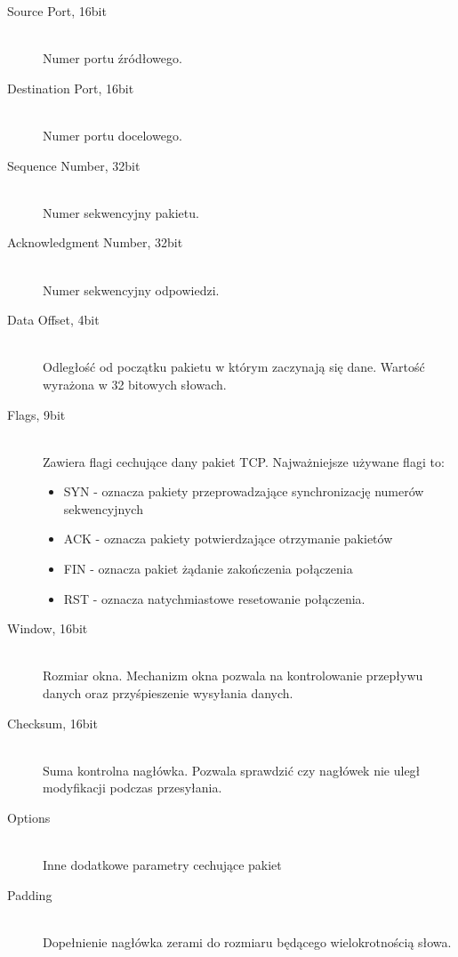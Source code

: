 			\begin{description}
			\item[Source Port, 16bit]\hfill \\
				Numer portu źródłowego.
			\item[Destination Port, 16bit]\hfill \\
				Numer portu docelowego.
			\item[Sequence Number, 32bit]\hfill \\
				Numer sekwencyjny pakietu.
			\item[Acknowledgment Number, 32bit]\hfill \\
				Numer sekwencyjny odpowiedzi.	
			\item[Data Offset, 4bit]\hfill \\
				Odległość od początku pakietu w którym zaczynają się dane.
				Wartość wyrażona w 32 bitowych słowach.
			\item[Flags, 9bit]\hfill \\
				Zawiera flagi cechujące dany pakiet TCP.
				Najważniejsze używane flagi to:
				\begin{itemize}
					\item SYN - oznacza pakiety przeprowadzające synchronizację numerów sekwencyjnych
					\item ACK - oznacza pakiety potwierdzające otrzymanie pakietów
					\item FIN - oznacza pakiet żądanie zakończenia połączenia
					\item RST - oznacza natychmiastowe resetowanie połączenia.
				\end{itemize}
			\item[Window, 16bit]\hfill \\
				Rozmiar okna. Mechanizm okna pozwala na kontrolowanie przepływu danych oraz przyśpieszenie wysyłania danych.
			\item[Checksum, 16bit]\hfill \\
				Suma kontrolna nagłówka. Pozwala sprawdzić czy nagłówek nie uległ modyfikacji podczas przesyłania.
			\item[Options]\hfill\\
				Inne dodatkowe parametry cechujące pakiet
			\item[Padding]\hfill\\
				Dopełnienie nagłówka zerami do rozmiaru będącego wielokrotnością słowa.
			\end{description}
